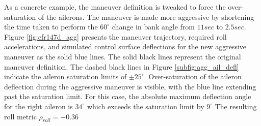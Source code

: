 As a concrete example, the maneuver definition is tweaked to force the over-saturation of the ailerons.
The maneuver is made more aggressive by shortening the time taken to perform the $60^\circ$ change in bank angle from $11 sec$ to $2.5 sec$.
Figure \ref{fig:cfr147d_agg} presents the maneuver trajectory, required roll accelerations, and simulated control surface deflections for the new aggressive maneuver as the solid blue lines. 
The solid black lines represent the original maneuver definition. 
The dashed black lines in Figure \ref{subfig:agg_ail_defl} indicate the aileron saturation limits of $\pm 25^\circ$.
Over-saturation of the aileron deflection during the aggressive maneuver is visible, with the blue line extending past the saturation limit. 
For this case, the absolute maximum deflection angle for the right aileron is $34^\circ$ which exceeds the saturation limit by $9^\circ$
The resulting roll metric $\rho_{roll} = -0.36$

